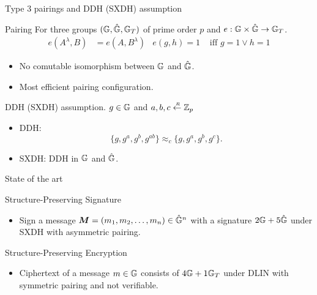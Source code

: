 \begin{frame}{Type 3 pairings and DDH (SXDH) assumption}
  \begin{block}{Pairing}
    For three groups $(\mathbb{G}, \hat{\mathbb{G}}, \mathbb{G}_T)$ of prime order $p$ and $e: \mathbb{G} \times \hat{\mathbb{G}} \to \mathbb{G}_T$.
    \begin{align*}
      e(A^{\lambda}, B) &= e(A, B^{\lambda}) & e(g,h) = 1 &\mbox{ iff } g=1 \vee h=1 
    \end{align*}
    \pause
    \begin{itemize}
    \item No comutable isomorphism between $\mathbb{G}$ and $\hat{\mathbb{G}}$.
      \pause
    \item Most efficient pairing configuration.
    \end{itemize}
  \end{block}
  \pause
  \begin{block}{DDH (SXDH) assumption}.
    $g \in \mathbb{G}$ and $a,b,c \stackrel{{\scriptscriptstyle \mkern4mu R}}{\gets} \mathbb{Z}_p$
 
    \begin{itemize}
    \item DDH:
      $$\{g,g^a, g^b, g^{ab}\} \approx_c \{g, g^a, g^b, g^c\}.$$
    \item SXDH: DDH in $\mathbb{G}$ and $\hat{\mathbb{G}}$.
    \end{itemize}
  \end{block}
 
\end{frame}


\begin{frame}{State of the art}
  
  \begin{block}{Structure-Preserving Signature}
    \begin{itemize}
    \item \cite{DBLP:journals/iacr/AbeHO10} Sign a message $\boldsymbol{M} = (m_1, m_2, \dots, m_n) \in \hat{\mathbb{G}}^n$ with a signature $2\mathbb{G} + 5\hat{\mathbb{G}}$ under SXDH with asymmetric pairing.
    \end{itemize}
  \end{block}

  \pause

  \begin{block}{Structure-Preserving Encryption}
    \begin{itemize}
    \item \cite{DBLP:conf/asiacrypt/CamenischHKLN11} Ciphertext of a message $m \in \mathbb{G}$ consists of $4\mathbb{G} + 1 \mathbb{G}_T$ under DLIN with symmetric pairing and not verifiable.
    \end{itemize}
  \end{block}
    
\end{frame}
